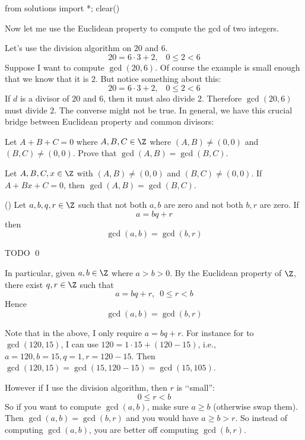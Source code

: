 \begin{python0}
from solutions import *; clear()
\end{python0}

Now let me use the Euclidean property to compute the gcd of two integers.

Let's use the division algorithm on $20$ and $6$.
\[
20 = 6 \cdot 3 + 2, \,\,\,\,\, 0 \leq 2 < 6
\]
Suppose I want to compute $\gcd(20, 6)$.
Of course the example is small enough that we know that it is $2$.
But notice something about this:
\[
20 = 6 \cdot 3 + 2, \,\,\,\,\, 0 \leq 2 < 6
\]
If $d$ is a divisor of $20$ and $6$, then it must also divide
$2$.
Therefore $\gcd(20, 6)$ must divide $2$.
The converse might not be true.
In general, we have this crucial
bridge between Euclidean property and 
common divisors:

\begin{ex}
Let $A + B + C = 0$ where $A, B, C \in \Z$ where $(A, B) \neq (0,0)$
and $(B,C) \neq (0,0)$.
Prove that $\gcd(A, B) = \gcd(B, C)$.
\end{ex}

\begin{ex}
Let $A, B, C, x \in \Z$ with $(A,B) \neq (0,0)$ and $(B,C) \neq (0,0)$.
If $A + Bx + C = 0$,
then $\gcd(A, B) = \gcd(B, C)$.
\end{ex}

\begin{lem}
  \textnormal{()}
  Let $a,b,q,r \in \Z$ such that
  not both $a,b$ are zero and not both $b,r$ are zero.
  If
  \[
  a = bq + r
  \]
  then
  \[
  \gcd(a,b) = \gcd(b, r)
  \]
\end{lem}
\proof
TODO
\qed


In particular, 
given $a, b \in \Z$ where $a > b > 0$.
By the Euclidean property of $\Z$, there exist $q,r \in \Z$ such that
\[
a = bq + r, \,\,\, 0 \leq r < b
\]
Hence
\[
\gcd(a,b) = \gcd(b, r)
\]

Note that in the above, I only require $a = bq + r$.
For instance for to $\gcd(120, 15)$, I can use
$120 = 1\cdot 15 + (120 - 15)$, i.e., $a = 120, b = 15, q = 1, r = 120-15$.
Then $\gcd(120, 15) = \gcd(15, 120-15) = \gcd(15, 105)$.

However if I use the division algorithm, then 
$r$ is \lq\lq small'':
\[
0 \leq r < b
\]
So if you want to compute $\gcd(a,b)$, make sure $a \geq b$ (otherwise
swap them).
Then $\gcd(a, b) = \gcd(b, r)$ and you would have $a \geq b > r$.
So instead of computing $\gcd(a, b)$, you are better off
computing $\gcd(b, r)$.

